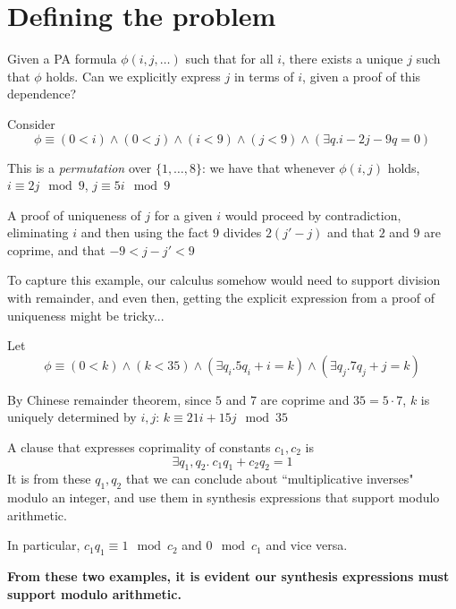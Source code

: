 \documentclass{article}
\begin{document}
\section{Defining the problem}

\begin{question}[Adwait]
Given a PA formula $\phi(i, j, \dots)$ such that for all $i$, there exists a unique $j$ such that $\phi$ holds. Can we explicitly express $j$ in terms of $i$, given a proof of this dependence?
\end{question}

\begin{example}
Consider $$\phi \equiv (0 < i) \land (0 < j) \land (i < 9) \land (j < 9) \land (\exists q. i - 2j -9q = 0)$$
\end{example}
This is a \emph{permutation} over $\{1, \dots, 8\}$: we have that whenever $\phi(i, j)$ holds, $i \equiv 2j \mod 9$, $j \equiv 5i \mod 9$

A proof of uniqueness of $j$ for a given $i$ would proceed by contradiction, eliminating $i$ and then using the fact $9$ divides $2(j' - j)$ and that $2$ and $9$ are coprime, and that $-9 <  j - j' < 9$ 

To capture this example, our calculus somehow would need to support division with remainder, and even then, getting the explicit expression from a proof of uniqueness might be tricky...

\begin{example}
Let
$$
\phi \equiv (0 < k) \land (k < 35) \land (\exists q_i. 5q_i + i = k) \land (\exists q_j . 7q_j + j = k)
$$
\end{example}
By Chinese remainder theorem, since $5$ and $7$ are coprime and $35 = 5 \cdot 7$, $k$ is uniquely determined by $i, j$: $k \equiv 21i + 15j \mod 35$

A clause that expresses coprimality of constants $c_1, c_2$ is 
$$
\exists q_1, q_2 . ~c_1q_1 + c_2 q_2 = 1
$$
It is from these $q_1, q_2$ that we can conclude about ``multiplicative inverses" modulo an integer, and use them in synthesis expressions that support modulo arithmetic.

In particular, $c_1 q_1 \equiv 1 \mod c_2$ and $0 \mod c_1$ and vice versa.

\textbf{From these two examples, it is evident our synthesis expressions must support modulo arithmetic.}
\end{document}
